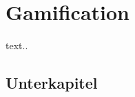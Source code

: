 \section{Gamification}
\label{sec:theorieB}

text..

\subsection{Unterkapitel}
\label{sec:theorieBa}
